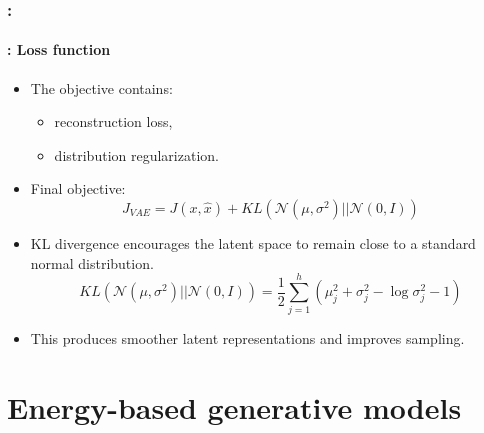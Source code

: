 \documentclass[xcolor=table]{beamer}
\begin{document}
	
	\begin{frame}
		\frametitle{\insertshortsubtitle: \insertsection}
		\framesubtitle{\insertsubsection: Loss function}
		
		\begin{itemize}
			\item The objective contains:
			
			\begin{itemize}
				\item reconstruction loss,
				\item distribution regularization.
			\end{itemize}
			
			\item Final objective:
			\[
			J_{VAE} = J(x, \hat{x}) + KL\left( \mathcal{N}(\mu, \sigma^2) || \mathcal{N}(0, I) \right)
			\]
			
			\item KL divergence encourages the latent space to remain close to a standard normal distribution.
			\[
			KL\left(\mathcal{N}(\mu,\sigma^2)||\mathcal{N}(0,I)\right) = \frac{1}{2} \sum_{j=1}^h \left(\mu_j^2 + \sigma_j^2 - \log \sigma_j^2 - 1 \right) 
			\]
			
			\item This produces smoother latent representations and improves sampling.
			
		\end{itemize}
		
	\end{frame}
	
	
	\section{Energy-based generative models}
	
\end{document}
